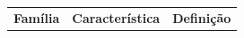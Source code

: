 \documentclass[msc]{on} %
\providecommand{\DIFaddbeginFL}{} %
\providecommand{\DIFdelendFL}{} %
\begin{document}
\begin{table}[htbp]
\DIFdelendFL \DIFaddbeginFL \begin{tabular}{llp{7.1cm}}
\hline
\textbf{Família} & \textbf{Característica} & \textbf{Definição} \\

\end{tabular}
\end{table}
\end{document}
